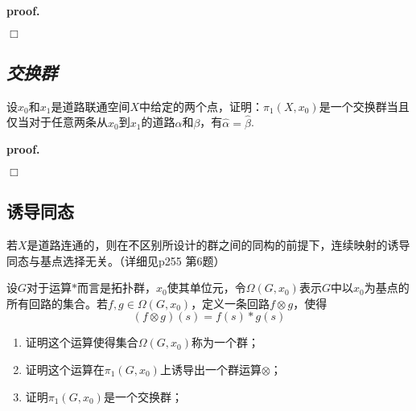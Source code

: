 \textbf{proof.}

$\Box$

\subsection*{\textsl{交换群}}

\begin{mdframed}
    \begin{question}
        设$x_0$和$x_1$是道路联通空间$X$中给定的两个点，证明：$\pi_1(X,x_0)$是一个交换群当且仅当对于任意两条从$x_0$到$x_1$的道路$\alpha$和$\beta$，有$\hat{\alpha}=\hat{\beta}$.
    \end{question}
\end{mdframed}

\textbf{proof.}

$\Box$

\subsection*{诱导同态}

\begin{mdframed}
    \begin{question}
        若$X$是道路连通的，则在不区别所设计的群之间的同构的前提下，连续映射的诱导同态与基点选择无关。（详细见p255 第6题）
    \end{question}
\end{mdframed}

\begin{mdframed}
    \begin{question}
        设$G$对于运算$*$而言是拓扑群，$x_0$使其单位元，令$\Omega(G,x_0)$表示$G$中以$x_0$为基点的所有回路的集合。若$f,g\in \Omega(G,x_0)$，定义一条回路$f\otimes g$，使得
        \begin{equation}
            (f\otimes g)(s)=f(s)*g(s)
        \end{equation}

        \begin{enumerate}[itemindent=2em]
            \item 证明这个运算使得集合$\Omega(G,x_0)$称为一个群；
            \item 证明这个运算在$\pi_1(G,x_0)$上诱导出一个群运算$\otimes$；
            \item 证明$\pi_1(G,x_0)$是一个交换群；
        \end{enumerate}
    \end{question}
\end{mdframed}


